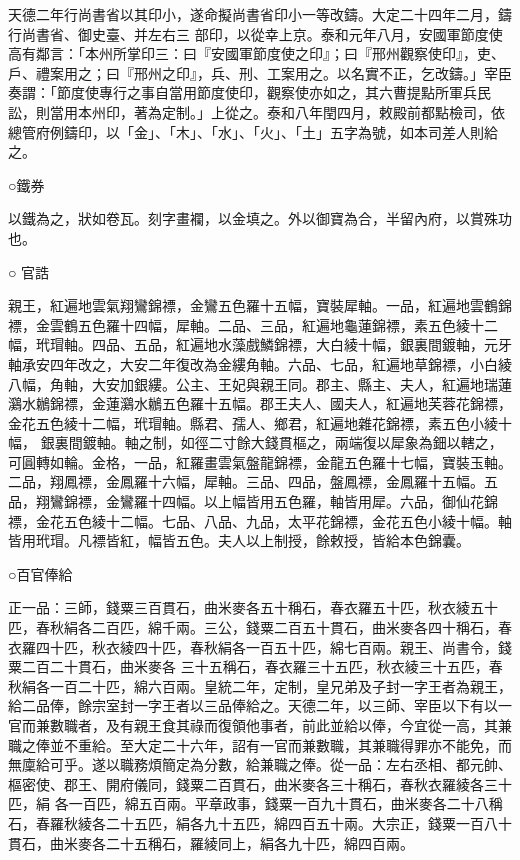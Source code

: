 \begin{pinyinscope}
 天德二年行尚書省以其印小，遂命擬尚書省印小一等改鑄。大定二十四年二月，鑄行尚書省、御史臺、并左右三
 部印，以從幸上京。泰和元年八月，安國軍節度使高有鄰言：「本州所掌印三：曰『安國軍節度使之印』；曰『邢州觀察使印』，吏、戶、禮案用之；曰『邢州之印』，兵、刑、工案用之。以名實不正，乞改鑄。」宰臣奏謂：「節度使專行之事自當用節度使印，觀察使亦如之，其六曹提點所軍兵民訟，則當用本州印，著為定制。」上從之。泰和八年閏四月，敕殿前都點檢司，依總管府例鑄印，以「金」、「木」、「水」、「火」、「土」五字為號，如本司差人則給之。



 ○鐵券



 以鐵為之，狀如卷瓦。刻字畫襴，以金填之。外以御寶為合，半留內府，以賞殊功也。



 ○
 官誥



 親王，紅遍地雲氣翔鸞錦褾，金鸞五色羅十五幅，寶裝犀軸。一品，紅遍地雲鶴錦褾，金雲鶴五色羅十四幅，犀軸。二品、三品，紅遍地龜蓮錦褾，素五色綾十二幅，玳瑁軸。四品、五品，紅遍地水藻戲鱗錦褾，大白綾十幅，銀裏間鍍軸，元牙軸承安四年改之，大安二年復改為金縷角軸。六品、七品，紅遍地草錦褾，小白綾八幅，角軸，大安加銀縷。公主、王妃與親王同。郡主、縣主、夫人，紅遍地瑞蓮鸂水鶒錦褾，金蓮鸂水鶒五色羅十五幅。郡王夫人、國夫人，紅遍地芙蓉花錦褾，金花五色綾十二幅，玳瑁軸。縣君、孺人、鄉君，紅遍地雜花錦褾，素五色小綾十幅，
 銀裏間鍍軸。軸之制，如徑二寸餘大錢貫樞之，兩端復以犀象為鈿以轄之，可圓轉如輪。金格，一品，紅羅畫雲氣盤龍錦褾，金龍五色羅十七幅，寶裝玉軸。二品，翔鳳褾，金鳳羅十六幅，犀軸。三品、四品，盤鳳褾，金鳳羅十五幅。五品，翔鸞錦褾，金鸞羅十四幅。以上幅皆用五色羅，軸皆用犀。六品，御仙花錦褾，金花五色綾十二幅。七品、八品、九品，太平花錦褾，金花五色小綾十幅。軸皆用玳瑁。凡褾皆紅，幅皆五色。夫人以上制授，餘敕授，皆給本色錦囊。



 ○百官俸給



 正一品：三師，錢粟三百貫石，曲米麥各五十稱石，春衣羅五十匹，秋衣綾五十匹，春秋絹各二百匹，綿千兩。三公，錢粟二百五十貫石，曲米麥各四十稱石，春衣羅四十匹，秋衣綾四十匹，春秋絹各一百五十匹，綿七百兩。親王、尚書令，錢粟二百二十貫石，曲米麥各
 三十五稱石，春衣羅三十五匹，秋衣綾三十五匹，春秋絹各一百二十匹，綿六百兩。皇統二年，定制，皇兄弟及子封一字王者為親王，給二品俸，餘宗室封一字王者以三品俸給之。天德二年，以三師、宰臣以下有以一官而兼數職者，及有親王食其祿而復領他事者，前此並給以俸，今宜從一高，其兼職之俸並不重給。至大定二十六年，詔有一官而兼數職，其兼職得罪亦不能免，而無廩給可乎。遂以職務煩簡定為分數，給兼職之俸。從一品：左右丞相、都元帥、樞密使、郡王、開府儀同，錢粟二百貫石，曲米麥各三十稱石，春秋衣羅綾各三十匹，絹
 各一百匹，綿五百兩。平章政事，錢粟一百九十貫石，曲米麥各二十八稱石，春羅秋綾各二十五匹，絹各九十五匹，綿四百五十兩。大宗正，錢粟一百八十貫石，曲米麥各二十五稱石，羅綾同上，絹各九十匹，綿四百兩。




\end{pinyinscope}
